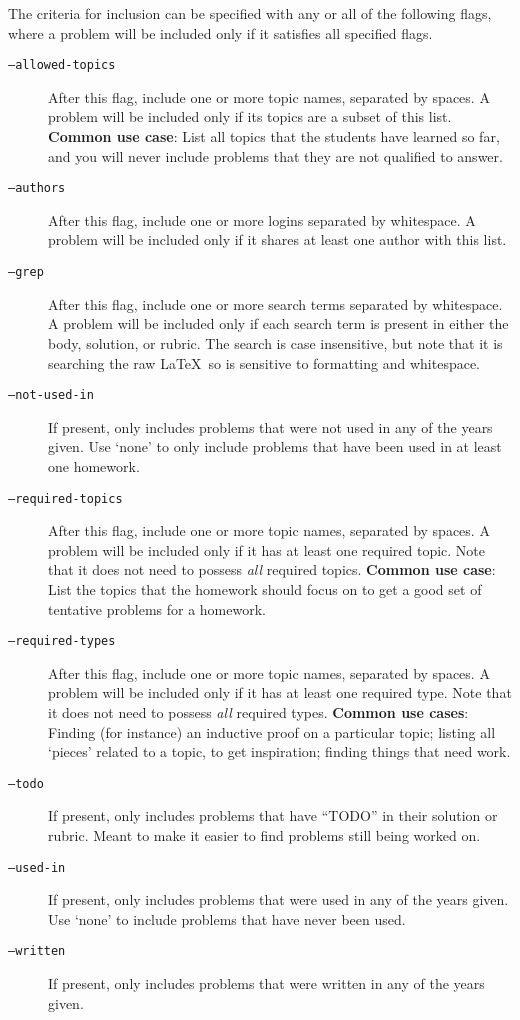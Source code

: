     The criteria for inclusion can be specified with any or all of the following flags, where a problem will be included only if it satisfies all specified flags.
    \begin{description}
      \item[\texttt{--allowed-topics}] After this flag, include one or more topic names, separated by spaces. A problem will be included only if its topics are a subset of this list. \textbf{Common use case}: List all topics that the students have learned so far, and you will never include problems that they are not qualified to answer.
      \item[\texttt{--authors}] After this flag, include one or more 
          logins separated by whitespace. A problem will be included only if
          it shares at least one author with this list.
      \item[\texttt{--grep}] After this flag, include one or more search terms separated by whitespace. A problem will be included only if each search term is present in either the body, solution, or rubric. The search is case insensitive, but note that it is searching the raw \LaTeX\ so is sensitive to formatting and whitespace.
      \item[\texttt{--not-used-in}] If present, only includes problems that were not used in any of the years given. Use `none' to only include problems that have been used in at least one homework.
      \item[\texttt{--required-topics}] After this flag, include one or more topic names, separated by spaces. A problem will be included only if it has at least one required topic. Note that it does not need to possess \textit{all} required topics. \textbf{Common use case}: List the topics that the homework should focus on to get a good set of tentative problems for a homework.
      \item[\texttt{--required-types}] After this flag, include one or more topic names, separated by spaces. A problem will be included only if it has at least one required type. Note that it does not need to possess \textit{all} required types. \textbf{Common use cases}: Finding (for instance) an inductive proof on a particular topic; listing all `pieces' related to a topic, to get inspiration; finding things that need work.
      \item[\texttt{--todo}] If present, only includes problems that have ``TODO'' in their solution or rubric. Meant to make it easier to find problems still being worked on.
      \item[\texttt{--used-in}] If present, only includes problems that were used in any of the years given. Use `none' to include problems that have never been used. 
      \item[\texttt{--written}] If present, only includes problems that were written in any of the years given.
    \end{description}